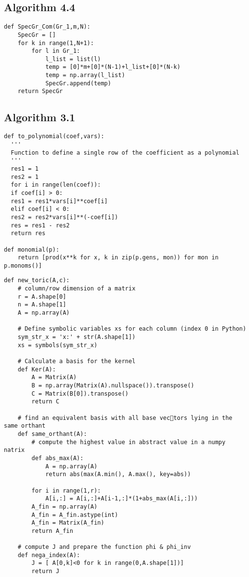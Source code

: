 \documentclass{article}
\theoremstyle{plain}
\theoremstyle{definition}
\begin{document}
\begin{propsition}
\subsection{Algorithm 4.4}
\begin{verbatim}
def SpecGr_Com(Gr_1,m,N):
    SpecGr = []
    for k in range(1,N+1):
        for l in Gr_1:
            l_list = list(l)
            temp = [0]*m+[0]*(N-1)+l_list+[0]*(N-k)
            temp = np.array(l_list)
            SpecGr.append(temp)
    return SpecGr
\end{verbatim}

\subsection{Algorithm 3.1}
\begin{verbatim}
def to_polynomial(coef,vars):
  '''
  Function to define a single row of the coefficient as a polynomial
  '''
  res1 = 1
  res2 = 1
  for i in range(len(coef)):
  if coef[i] > 0:
  res1 = res1*vars[i]**coef[i]
  elif coef[i] < 0:
  res2 = res2*vars[i]**(-coef[i])
  res = res1 - res2
  return res
            
def monomial(p):
    return [prod(x**k for x, k in zip(p.gens, mon)) for mon in p.monoms()]
\end{verbatim}

\begin{verbatim}
def new_toric(A,c):
    # column/row dimension of a matrix
    r = A.shape[0]
    n = A.shape[1]
    A = np.array(A)
    
    # Define symbolic variables xs for each column (index 0 in Python)
    sym_str_x = 'x:' + str(A.shape[1])
    xs = symbols(sym_str_x)
    
    # Calculate a basis for the kernel
    def Ker(A):
        A = Matrix(A)
        B = np.array(Matrix(A).nullspace()).transpose()
        C = Matrix(B[0]).transpose()
        return C
    
    # find an equivalent basis with all base vectors lying in the same orthant
    def same_orthant(A):    
        # compute the highest value in abstract value in a numpy natrix
        def abs_max(A):
            A = np.array(A)
            return abs(max(A.min(), A.max(), key=abs))

        for i in range(1,r):
            A[i,:] = A[i,:]+A[i-1,:]*(1+abs_max(A[i,:]))
        A_fin = np.array(A)
        A_fin = A_fin.astype(int)
        A_fin = Matrix(A_fin)
        return A_fin
    
    # compute J and prepare the function phi & phi_inv
    def nega_index(A):
        J = [ A[0,k]<0 for k in range(0,A.shape[1])]
        return J


\end{verbatim}
\end{propsition}
\end{document}
